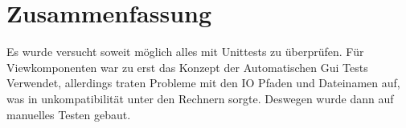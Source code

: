 \chapter{Zusammenfassung}
Es wurde versucht soweit möglich alles mit Unittests zu überprüfen. Für Viewkomponenten war zu erst das Konzept der Automatischen Gui Tests Verwendet, allerdings traten Probleme mit den IO Pfaden und Dateinamen auf, was in  unkompatibilität unter den Rechnern sorgte. Deswegen wurde dann auf manuelles Testen gebaut.
